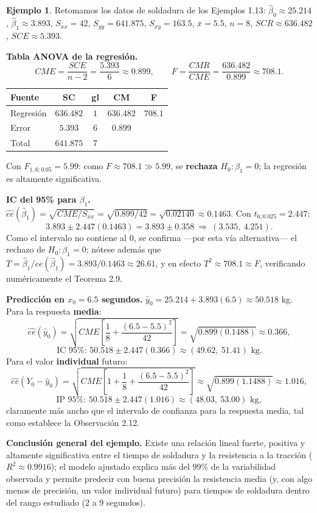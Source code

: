 \documentclass[11pt,a4paper]{article}
\theoremstyle{plain}
\theoremstyle{definition}
\newtheorem{ejemplo}[teorema]{Ejemplo}
\theoremstyle{remark}
\begin{document}
\begin{ejemplo}
Retomamos los datos de soldadura de los Ejemplos 1.13: $\hat\beta_0\approx25.214$, $\hat\beta_1\approx3.893$, $S_{xx}=42$, $S_{yy}=641.875$, $S_{xy}=163.5$, $\bar x=5.5$, $n=8$, $SCR\approx636.482$, $SCE\approx5.393$.

\medskip
\noindent\textbf{Tabla ANOVA de la regresión.}
\[
CME = \frac{SCE}{n-2} = \frac{5.393}{6} \approx 0.899, \qquad F = \frac{CMR}{CME} = \frac{636.482}{0.899} \approx 708.1.
\]

\begin{center}
\begin{tabular}{lcccc}
\toprule
Fuente & SC & gl & CM & F \\
\midrule
Regresión & $636.482$ & $1$ & $636.482$ & $708.1$ \\
Error & $5.393$ & $6$ & $0.899$ & \\
\midrule
Total & $641.875$ & $7$ & & \\
\bottomrule
\end{tabular}
\end{center}

Con $F_{1,6;0.05}=5.99$: como $F\approx708.1\gg5.99$, se \textbf{rechaza} $H_0:\beta_1=0$; la regresión es altamente significativa.

\medskip
\noindent\textbf{IC del 95\% para $\beta_1$.} $\widehat{ee}(\hat\beta_1)=\sqrt{CME/S_{xx}}=\sqrt{0.899/42}=\sqrt{0.02140}\approx0.1463$. Con $t_{6;0.025}=2.447$:
\[
3.893\pm2.447(0.1463) = 3.893\pm0.358 \ \Rightarrow\ (3.535,\ 4.251).
\]
Como el intervalo no contiene al $0$, se confirma —por esta vía alternativa— el rechazo de $H_0:\beta_1=0$; nótese además que $T=\hat\beta_1/\widehat{ee}(\hat\beta_1)=3.893/0.1463\approx26.61$, y en efecto $T^2\approx708.1\approx F$, verificando numéricamente el Teorema 2.9.

\medskip
\noindent\textbf{Predicción en $x_0=6.5$ segundos.} $\hat y_0=25.214+3.893(6.5)\approx50.518$ kg. Para la respuesta \textbf{media}:
\[
\widehat{ee}(\hat y_0) = \sqrt{CME\left[\frac18+\frac{(6.5-5.5)^2}{42}\right]} = \sqrt{0.899(0.1488)} \approx 0.366,
\]
\[
\text{IC 95\%: } 50.518\pm2.447(0.366) \approx (49.62,\ 51.41) \text{ kg}.
\]
Para el valor \textbf{individual} futuro:
\[
\widehat{ee}(Y_0-\hat y_0) = \sqrt{CME\left[1+\frac18+\frac{(6.5-5.5)^2}{42}\right]} \approx \sqrt{0.899(1.1488)} \approx 1.016,
\]
\[
\text{IP 95\%: } 50.518\pm2.447(1.016) \approx (48.03,\ 53.00) \text{ kg},
\]
claramente más ancho que el intervalo de confianza para la respuesta media, tal como establece la Observación 2.12.

\medskip
\noindent\textbf{Conclusión general del ejemplo.} Existe una relación lineal fuerte, positiva y altamente significativa entre el tiempo de soldadura y la resistencia a la tracción ($R^2\approx0.9916$); el modelo ajustado explica más del $99\%$ de la variabilidad observada y permite predecir con buena precisión la resistencia media (y, con algo menos de precisión, un valor individual futuro) para tiempos de soldadura dentro del rango estudiado ($2$ a $9$ segundos).
\end{ejemplo}
\end{document}
